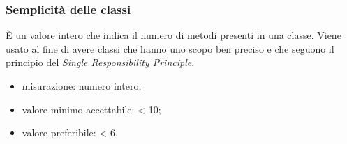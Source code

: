 	\subsubsection*{Semplicità delle classi}
	È un valore intero che indica il numero di metodi presenti in una classe. Viene usato al fine di avere classi che hanno uno scopo ben preciso e che seguono il principio del \textit{Single Responsibility Principle}.
		\begin{itemize}
			\item {misurazione: numero intero;}
			\item {valore minimo accettabile: < 10;}
			\item {valore preferibile: < 6.}
	\end{itemize}